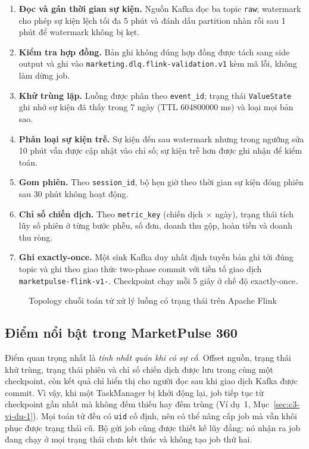 \begin{enumerate}
    \item \textbf{Đọc và gán thời gian sự kiện.} Nguồn Kafka đọc ba topic \texttt{raw}; watermark cho phép sự kiện lệch tối đa 5 phút và đánh dấu partition nhàn rỗi sau 1 phút để watermark không bị kẹt.
    \item \textbf{Kiểm tra hợp đồng.} Bản ghi không đúng hợp đồng được tách sang side output và ghi vào \texttt{marketing.dlq.flink-validation.v1} kèm mã lỗi, không làm dừng job.
    \item \textbf{Khử trùng lặp.} Luồng được phân theo \texttt{event\_id}; trạng thái \texttt{ValueState} ghi nhớ sự kiện đã thấy trong 7 ngày (TTL \num{604800000} ms) và loại mọi bản sao.
    \item \textbf{Phân loại sự kiện trễ.} Sự kiện đến sau watermark nhưng trong ngưỡng sửa 10 phút vẫn được cập nhật vào chỉ số; sự kiện trễ hơn được ghi nhận để kiểm toán.
    \item \textbf{Gom phiên.} Theo \texttt{session\_id}, bộ hẹn giờ theo thời gian sự kiện đóng phiên sau 30 phút không hoạt động.
    \item \textbf{Chỉ số chiến dịch.} Theo \texttt{metric\_key} (chiến dịch $\times$ ngày), trạng thái tích lũy số phiên ở từng bước phễu, số đơn, doanh thu gộp, hoàn tiền và doanh thu ròng.
    \item \textbf{Ghi exactly-once.} Một sink Kafka duy nhất định tuyến bản ghi tới đúng topic và ghi theo giao thức two-phase commit với tiền tố giao dịch \texttt{marketpulse-flink-v1-}. Checkpoint chạy mỗi 5 giây ở chế độ exactly-once.
\end{enumerate}

\begin{figure}[!htbp]
    \centering
    \resizebox{\textwidth}{!}{}
    \caption{Topology chuỗi toán tử xử lý luồng có trạng thái trên Apache Flink}
    \label{fig:flink}
\end{figure}

\subsection{Điểm nổi bật trong MarketPulse 360}
\label{sec:c3-flink-hien-thuc}
Điểm quan trọng nhất là \emph{tính nhất quán khi có sự cố}. Offset nguồn, trạng thái khử trùng, trạng thái phiên và chỉ số chiến dịch được lưu trong cùng một checkpoint, còn kết quả chỉ hiển thị cho người đọc sau khi giao dịch Kafka được commit. Vì vậy, khi một TaskManager bị khởi động lại, job tiếp tục từ checkpoint gần nhất mà không đếm thiếu hay đếm trùng (Ví dụ~1, Mục~\ref{sec:c3-vi-du-1}). Mọi toán tử đều có \texttt{uid} cố định, nên có thể nâng cấp job mà vẫn khôi phục được trạng thái cũ. Bộ gửi job cũng được thiết kế lũy đẳng: nó nhận ra job đang chạy ở mọi trạng thái chưa kết thúc và không tạo job thứ hai.

